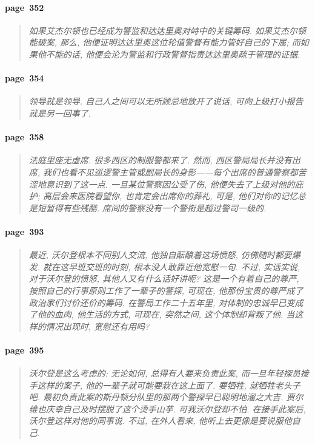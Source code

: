 \paragraph*{page~352}
\begin{quotation}
    \itshape
    如果艾杰尔顿也已经成为警监和达达里奥对峙中的关键筹码. 如果艾杰尔顿能破案, 那么, 他便证明达达里奥这位轮值警督有能力管好自己的下属; 而如果他不能的话, 他便会沦为警监和行政警督指责达达里奥疏于管理的证据. 
\end{quotation}

\paragraph*{page~354}
\begin{quotation}
    \itshape
    领导就是领导. 自己人之间可以无所顾忌地放开了说话, 可向上级打小报告就是另一回事了.
\end{quotation}

\paragraph*{page~358}
\begin{quotation}
    \itshape
    法庭里座无虚席. 很多西区的制服警都来了. 然而, 西区警局局长并没有出席, 我们也看不见巡逻警主管或副局长的身影------每个出席的普通警察都苦涩地意识到了这一点. 一旦某位警察因公受了伤, 他便失去了上级对他的庇护; 高层会来医院看望你, 也肯定会出席你的葬礼, 可是, 他们对你的记忆总是短暂得有些残酷. 席间的警察没有一个警衔是超过警司一级的.  
\end{quotation}

\paragraph*{page~393}
\begin{quotation}
    \itshape
    最近, 沃尔登根本不同别人交流, 他独自酝酿着这场愤怒, 仿佛随时都要爆发. 就在这早班交班的时刻, 根本没人敢靠近他宽慰一句. 不过, 实话实说, 对于沃尔登的愤怒, 其他人又有什么话好讲呢? 这是一个有着自己的尊严, 按照自己的行事原则工作了一辈子的警探, 可现在, 他那份宝贵的尊严成了政治家们讨价还价的筹码. 在警局工作二十五年里, 对体制的忠诚早已变成了他的血肉, 他生活的方式, 可现在, 突然之间, 这个体制却背叛了他. 当这样的情况出现时, 宽慰还有用吗?
\end{quotation}

\paragraph*{page~395}
\begin{quotation}
    \itshape
    沃尔登是这么考虑的: 无论如何, 总得有人要来负责此案, 而一旦年轻探员接手这样的案子, 他的一辈子就可能要栽在这上面了. 要牺牲, 就牺牲老头子吧. 最初负责此案的斯丹顿分队里的那两个警探早已聪明地溜之大吉. 贾尔维也庆幸自己及时摆脱了这个烫手山芋. 可我沃尔登却不怕. 在接手此案后, 沃尔登这样对他的同事说. 不过, 在外人看来, 他听上去更像是要说服他自己.
\end{quotation}

